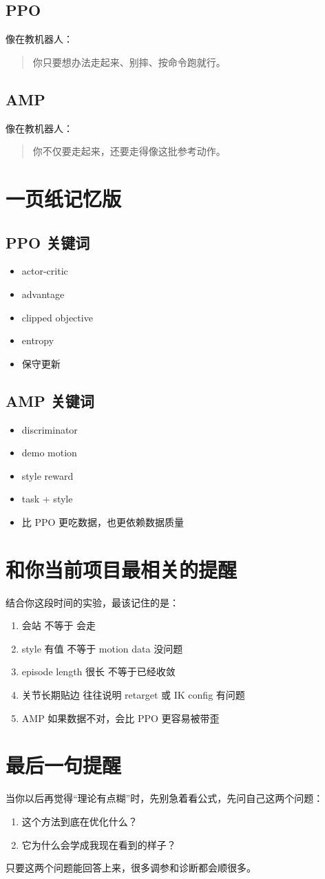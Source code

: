 \documentclass[11pt,a4paper]{article}
\begin{document}
\subsection*{PPO}
像在教机器人：
\begin{quote}
你只要想办法走起来、别摔、按命令跑就行。
\end{quote}

\subsection*{AMP}
像在教机器人：
\begin{quote}
你不仅要走起来，还要走得像这批参考动作。
\end{quote}

\section{一页纸记忆版}
\subsection*{PPO 关键词}
\begin{itemize}
\item actor-critic
\item advantage
\item clipped objective
\item entropy
\item 保守更新
\end{itemize}

\subsection*{AMP 关键词}
\begin{itemize}
\item discriminator
\item demo motion
\item style reward
\item task + style
\item 比 PPO 更吃数据，也更依赖数据质量
\end{itemize}

\section{和你当前项目最相关的提醒}
结合你这段时间的实验，最该记住的是：
\begin{enumerate}
\item 会站 不等于 会走
\item style 有值 不等于 motion data 没问题
\item episode length 很长 不等于已经收敛
\item 关节长期贴边 往往说明 retarget 或 IK config 有问题
\item AMP 如果数据不对，会比 PPO 更容易被带歪
\end{enumerate}

\section{最后一句提醒}
当你以后再觉得“理论有点糊”时，先别急着看公式，先问自己这两个问题：
\begin{enumerate}
\item 这个方法到底在优化什么？
\item 它为什么会学成我现在看到的样子？
\end{enumerate}

只要这两个问题能回答上来，很多调参和诊断都会顺很多。
\end{document}

